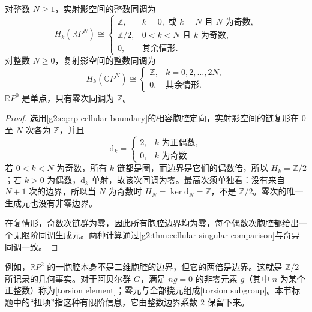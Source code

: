 \begin{proposition}\label{g2:prop:projective-integer-homology}
	对整数 \(N\geq1\)，实射影空间的整数同调为
	\[
		H_k(\mathbb RP^N)\cong
		\begin{cases}
			\mathbb Z,&k=0,\text{ 或 }k=N\text{ 且 }N\text{ 为奇数},\\
			\mathbb Z/2,&0<k<N\text{ 且 }k\text{ 为奇数},\\
			0,&\text{其余情形}.
		\end{cases}
	\]
	对整数 \(N\geq0\)，复射影空间的整数同调为
	\[
		H_k(\mathbb CP^N)\cong
		\begin{cases}
			\mathbb Z,&k=0,2,\ldots,2N,\\
			0,&\text{其余情形}.
		\end{cases}
	\]
	\(\mathbb RP^0\) 是单点，只有零次同调为 \(\mathbb Z\)。
\end{proposition}
\begin{proof}
	选用\eqref{g2:eq:rp-cellular-boundary}的相容胞腔定向，实射影空间的链复形在 \(0\) 至 \(N\) 次各为 \(\mathbb Z\)，并且
	\[
		\mathrm{d}_k=
		\begin{cases}
			2,&k\text{ 为正偶数},\\
			0,&k\text{ 为奇数}.
		\end{cases}
	\]
	若 \(0<k<N\) 为奇数，所有 \(k\) 链都是圈，而边界是它们的偶数倍，所以 \(H_k=\mathbb Z/2\)；若 \(k>0\) 为偶数，\(\mathrm{d}_k\) 单射，故该次同调为零。最高次须单独看：没有来自 \(N+1\) 次的边界，所以当 \(N\) 为奇数时 \(H_N=\ker\mathrm{d}_N=\mathbb Z\)，不是 \(\mathbb Z/2\)。零次的唯一生成元也没有非零边界。

	在复情形，奇数次链群为零，因此所有胞腔边界均为零，每个偶数次胞腔都给出一个无限阶同调生成元。两种计算通过\cref{g2:thm:cellular-singular-comparison}与奇异同调一致。
\end{proof}

例如，\(\mathbb RP^2\) 的一胞腔本身不是二维胞腔的边界，但它的两倍是边界。这就是 \(\mathbb Z/2\) 所记录的几何事实。对于阿贝尔群 \(G\)，满足 \(ng=0\) 的非零元素 \(g\)（其中 \(n\) 为某个正整数）称为[torsion element]；零元与全部挠元组成[torsion subgroup]。本节标题中的“扭项”指这种有限阶信息，它由整数边界系数 \(2\) 保留下来。

\ProseParagraphBreak

